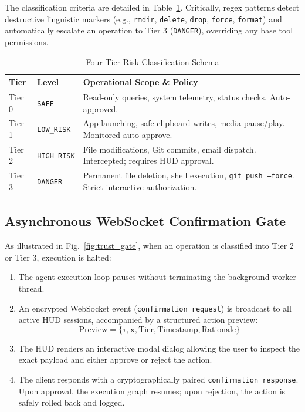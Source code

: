 \documentclass[conference]{IEEEtran}
\begin{document}
The classification criteria are detailed in Table~\ref{tab:trust_tiers}. Critically, regex patterns detect destructive linguistic markers (e.g., \texttt{rmdir}, \texttt{delete}, \texttt{drop}, \texttt{force}, \texttt{format}) and automatically escalate an operation to Tier 3 (\texttt{DANGER}), overriding any base tool permissions.

\begin{table}[h]
\caption{Four-Tier Risk Classification Schema}
\label{tab:trust_tiers}
\centering
\begin{tabular}{@{}llp{3.8cm}@{}}
\toprule
\textbf{Tier} & \textbf{Level} & \textbf{Operational Scope \& Policy} \\ \midrule
Tier 0 & \texttt{SAFE} & Read-only queries, system telemetry, status checks. Auto-approved. \\
Tier 1 & \texttt{LOW\_RISK} & App launching, safe clipboard writes, media pause/play. Monitored auto-approve. \\
Tier 2 & \texttt{HIGH\_RISK} & File modifications, Git commits, email dispatch. Intercepted; requires HUD approval. \\
Tier 3 & \texttt{DANGER} & Permanent file deletion, shell execution, \texttt{git push --force}. Strict interactive authorization. \\ \bottomrule
\end{tabular}
\end{table}

\subsection{Asynchronous WebSocket Confirmation Gate}
As illustrated in Fig.~\ref{fig:trust_gate}, when an operation is classified into Tier 2 or Tier 3, execution is halted:
\begin{enumerate}
    \item The agent execution loop pauses without terminating the background worker thread.
    \item An encrypted WebSocket event (\texttt{confirmation\_request}) is broadcast to all active HUD sessions, accompanied by a structured action preview:
    \begin{equation}
        \text{Preview} = \{\tau, \mathbf{x}, \text{Tier}, \text{Timestamp}, \text{Rationale}\}
    \end{equation}
    \item The HUD renders an interactive modal dialog allowing the user to inspect the exact payload and either approve or reject the action.
    \item The client responds with a cryptographically paired \texttt{confirmation\_response}. Upon approval, the execution graph resumes; upon rejection, the action is safely rolled back and logged.
\end{enumerate}
\end{document}
